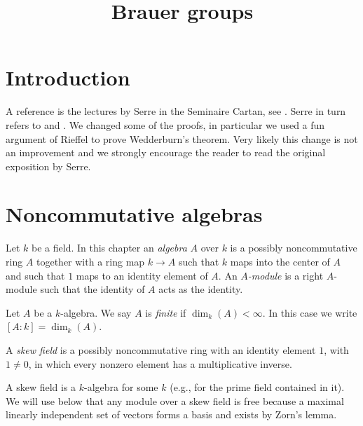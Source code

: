 

%


\title{Brauer groups}


\maketitle

\label{section-phantom}

\tableofcontents

\section{Introduction}
\label{section-introduction}

\noindent
A reference is the lectures by Serre in the Seminaire Cartan, see
\cite{Serre-Cartan}. Serre in turn refers to
\cite{Deuring} and \cite{ANT}. We changed some of the proofs, in particular
we used a fun argument of Rieffel to prove Wedderburn's theorem.
Very likely this change is not an improvement and we strongly
encourage the reader to read the original exposition by Serre.


\section{Noncommutative algebras}
\label{section-algebras}

\noindent
Let $k$ be a field. In this chapter an {\it algebra} $A$ over $k$ is
a possibly noncommutative ring $A$ together with a ring map
$k \to A$ such that $k$ maps into the center of $A$ and such that
$1$ maps to an identity element of $A$. An {\it $A$-module} is a right
$A$-module such that the identity of $A$ acts as the identity.

\begin{definition}
\label{definition-finite}
Let $A$ be a $k$-algebra. We say $A$ is {\it finite} if $\dim_k(A) < \infty$.
In this case we write $[A : k] = \dim_k(A)$.
\end{definition}

\begin{definition}
\label{definition-skew-field}
A {\it skew field} is a possibly noncommutative ring with an identity
element $1$, with $1 \not = 0$, in which every nonzero element
has a multiplicative inverse.
\end{definition}

\noindent
A skew field is a $k$-algebra for some $k$ (e.g., for the prime field
contained in it). We will use below that any module over a skew field
is free because a maximal linearly independent set of vectors forms a
basis and exists by Zorn's lemma.

